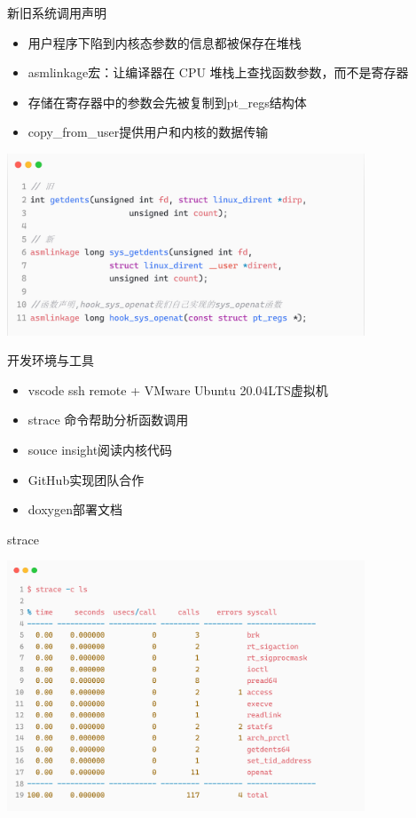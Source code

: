 \documentclass[11pt]{beamer}
\begin{document}
\begin{frame}{新旧系统调用声明}
	\begin{itemize}
		\item 用户程序下陷到内核态参数的信息都被保存在堆栈
		\item asmlinkage宏：让编译器在 CPU 堆栈上查找函数参数，而不是寄存器
		\item 存储在寄存器中的参数会先被复制到pt\_regs结构体
		\item copy\_from\_user提供用户和内核的数据传输
	\end{itemize}
	\begin{itemize}
		\centering
		\includegraphics[width=0.80\textwidth]{pic/diff-syscall.png}
	\end{itemize}
\end{frame}


\begin{frame}{开发环境与工具}
	\begin{itemize}
		\item vscode ssh remote + VMware Ubuntu 20.04LTS虚拟机
		\item strace 命令帮助分析函数调用
		\item souce insight阅读内核代码
		\item GitHub实现团队合作
		\item doxygen部署文档
	\end{itemize}
\end{frame}

\begin{frame}{strace}
		\begin{itemize}
			\centering
			\includegraphics[width=0.80\textwidth]{pic/strace.png}
		\end{itemize}
\end{frame}
\end{document}
